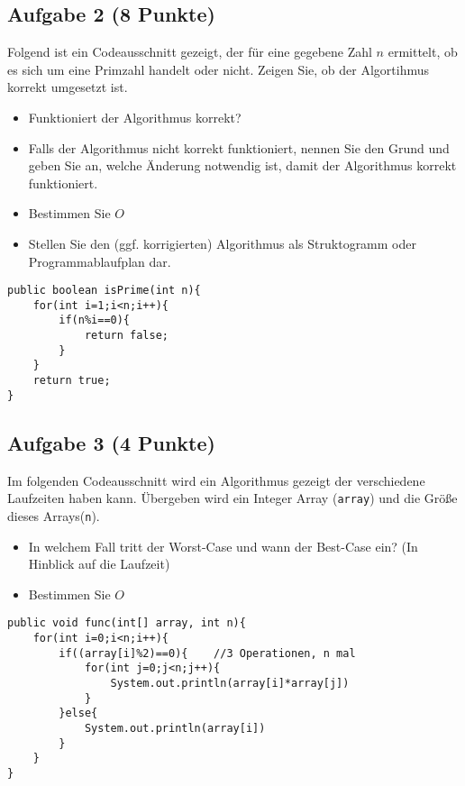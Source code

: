 \documentclass[a4paper,
			   fontsize=12pt]{article}
\begin{document}
\vspace{6cm}

\subsection*{Aufgabe 2 (8 Punkte)}
Folgend ist ein Codeausschnitt gezeigt, der für eine gegebene Zahl $n$ ermittelt, ob es sich um eine Primzahl handelt oder nicht. Zeigen Sie, ob der Algortihmus korrekt umgesetzt ist.
\begin{itemize}
	\item Funktioniert der Algorithmus korrekt?
	\item Falls der Algorithmus nicht korrekt funktioniert, nennen Sie den Grund und geben Sie an, welche Änderung notwendig ist, damit der Algorithmus korrekt funktioniert.
	\item Bestimmen Sie $O$
	\item Stellen Sie den (ggf. korrigierten) Algorithmus als Struktogramm oder Programmablaufplan dar.
\end{itemize}

\lstset{style=java}
\begin{lstlisting}
public boolean isPrime(int n){
	for(int i=1;i<n;i++){
		if(n%i==0){
			return false;
		}
	}
	return true;
}
\end{lstlisting}

\vspace{7,5cm}

\subsection*{Aufgabe 3 (4 Punkte)}
Im folgenden Codeausschnitt wird ein Algorithmus gezeigt der verschiedene Laufzeiten haben kann. Übergeben wird ein Integer Array (\texttt{array}) und die Größe dieses
Arrays(\texttt{n}).
\begin{itemize}
	\item In welchem Fall tritt der Worst-Case und wann der Best-Case ein? (In Hinblick auf die Laufzeit)
	\item Bestimmen Sie $O$
\end{itemize}  

\begin{lstlisting}
public void func(int[] array, int n){
    for(int i=0;i<n;i++){
		if((array[i]%2)==0){	//3 Operationen, n mal
			for(int j=0;j<n;j++){
				System.out.println(array[i]*array[j])
			}
        }else{
			System.out.println(array[i])
        }
    }
}
\end{lstlisting}
\end{document}
